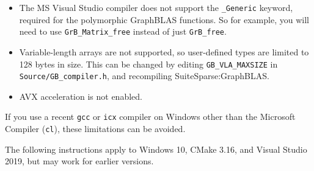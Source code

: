 \documentclass[12pt]{article}
\begin{document}
\begin{itemize}
\item The MS Visual Studio compiler does not support the \verb'_Generic'
keyword, required for the polymorphic GraphBLAS functions.  So for example, you
will need to use \verb'GrB_Matrix_free' instead of just \verb'GrB_free'.

\item Variable-length arrays are not supported, so user-defined
types are limited to 128 bytes in size.  This can be changed by editing
\verb'GB_VLA_MAXSIZE' in \verb'Source/GB_compiler.h', and recompiling
SuiteSparse:GraphBLAS.

\item AVX acceleration is not enabled.
\end{itemize}

If you use a recent \verb'gcc' or \verb'icx' compiler on Windows other than the
Microsoft Compiler (\verb'cl'), these limitations can be avoided.

The following instructions apply to Windows 10, CMake 3.16, and
Visual Studio 2019, but may work for earlier versions.
\end{document}

